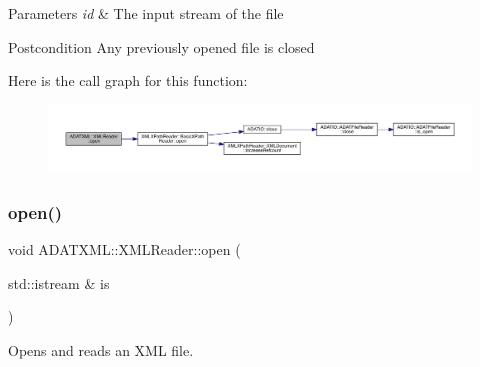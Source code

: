 \begin{DoxyParams}{Parameters}
{\em id} & The input stream of the file \\
\hline
\end{DoxyParams}
\begin{DoxyPostcond}{Postcondition}
Any previously opened file is closed 
\end{DoxyPostcond}
Here is the call graph for this function\+:
\nopagebreak
\begin{figure}[H]
\begin{center}
\leavevmode
\includegraphics[width=350pt]{db/d3f/classADATXML_1_1XMLReader_a7938cc7e08b0381e467eb7b916cbbd97_cgraph}
\end{center}
\end{figure}
\mbox{\label{classADATXML_1_1XMLReader_a7938cc7e08b0381e467eb7b916cbbd97}} 
\subsubsection{\texorpdfstring{open()}{open()}\hspace{0.1cm}{\footnotesize\ttfamily [5/9]}}
{\footnotesize\ttfamily void A\+D\+A\+T\+X\+M\+L\+::\+X\+M\+L\+Reader\+::open (\begin{DoxyParamCaption}\item[{std\+::istream \&}]{is }\end{DoxyParamCaption})\hspace{0.3cm}{\ttfamily [inline]}}



Opens and reads an X\+ML file. 


